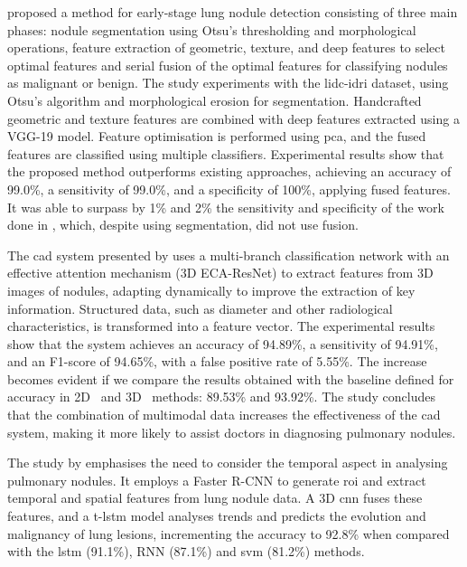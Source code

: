 \textcite{saba_lung_2019} proposed a method for early-stage lung nodule detection consisting of three main phases: nodule segmentation using Otsu's thresholding and morphological operations, feature extraction of geometric, texture, and deep features to select optimal features and serial fusion of the optimal features for classifying nodules as malignant or benign. The study experiments with the \ac{lidc-idri} dataset, using Otsu's algorithm and morphological erosion for segmentation. Handcrafted geometric and texture features are combined with deep features extracted using a VGG-19 model. Feature optimisation is performed using \ac{pca}, and the fused features are classified using multiple classifiers. Experimental results show that the proposed method outperforms existing approaches, achieving an accuracy of 99.0\%,  a sensitivity of 99.0\%, and a specificity of 100\%, applying fused features. It was able to surpass by 1\% and 2\% the sensitivity and specificity of the work done in \cite{naqi_multistage_2018}, which, despite using segmentation, did not use fusion.

The \ac{cad} system presented by \textcite{yuan_multi-modal_2023} uses a multi-branch classification network with an effective attention mechanism (3D ECA-ResNet) to extract features from 3D images of nodules, adapting dynamically to improve the extraction of key information. Structured data, such as diameter and other radiological characteristics, is transformed into a feature vector. The experimental results show that the system achieves an accuracy of 94.89\%, a sensitivity of 94.91\%, and an F1-score of 94.65\%, with a false positive rate of 5.55\%. The increase becomes evident if we compare the results obtained with the baseline defined for accuracy in 2D~\cite{xie_fusing_2018} and 3D~\cite{zhao_combining_2020} methods: 	
89.53\% and 93.92\%. The study concludes that the combination of multimodal data increases the effectiveness of the \ac{cad} system, making it more likely to assist doctors in diagnosing pulmonary nodules.

The study by \textcite{liu_study_2022} emphasises the need to consider the temporal aspect in analysing pulmonary nodules. It employs a Faster R-CNN to generate \ac{roi} and extract temporal and spatial features from lung nodule data. A 3D \ac{cnn} fuses these features, and a \ac{t-lstm} model analyses trends and predicts the evolution and malignancy of lung lesions, incrementing the accuracy to 92.8\% when compared with the \ac{lstm} (91.1\%), RNN (87.1\%) and \ac{svm} (81.2\%) methods.

